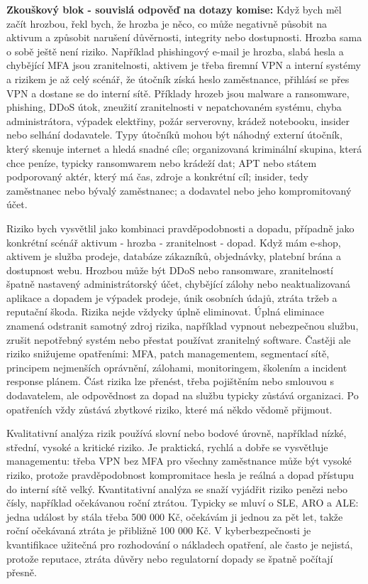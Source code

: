 \begin{beigebox}
\textbf{Zkouškový blok - souvislá odpověď na dotazy komise:}
Když bych měl začít hrozbou, řekl bych, že hrozba je něco, co může negativně působit na aktivum a způsobit narušení důvěrnosti, integrity nebo dostupnosti. Hrozba sama o sobě ještě není riziko. Například phishingový e-mail je hrozba, slabá hesla a chybějící MFA jsou zranitelnosti, aktivem je třeba firemní VPN a interní systémy a rizikem je až celý scénář, že útočník získá heslo zaměstnance, přihlásí se přes VPN a dostane se do interní sítě. Příklady hrozeb jsou malware a ransomware, phishing, DDoS útok, zneužití zranitelnosti v nepatchovaném systému, chyba administrátora, výpadek elektřiny, požár serverovny, krádež notebooku, insider nebo selhání dodavatele. Typy útočníků mohou být náhodný externí útočník, který skenuje internet a hledá snadné cíle; organizovaná kriminální skupina, která chce peníze, typicky ransomwarem nebo krádeží dat; APT nebo státem podporovaný aktér, který má čas, zdroje a konkrétní cíl; insider, tedy zaměstnanec nebo bývalý zaměstnanec; a dodavatel nebo jeho kompromitovaný účet.

Riziko bych vysvětlil jako kombinaci pravděpodobnosti a dopadu, případně jako konkrétní scénář aktivum - hrozba - zranitelnost - dopad. Když mám e-shop, aktivem je služba prodeje, databáze zákazníků, objednávky, platební brána a dostupnost webu. Hrozbou může být DDoS nebo ransomware, zranitelností špatně nastavený administrátorský účet, chybějící zálohy nebo neaktualizovaná aplikace a dopadem je výpadek prodeje, únik osobních údajů, ztráta tržeb a reputační škoda. Rizika nejde vždycky úplně eliminovat. Úplná eliminace znamená odstranit samotný zdroj rizika, například vypnout nebezpečnou službu, zrušit nepotřebný systém nebo přestat používat zranitelný software. Častěji ale riziko snižujeme opatřeními: MFA, patch managementem, segmentací sítě, principem nejmenších oprávnění, zálohami, monitoringem, školením a incident response plánem. Část rizika lze přenést, třeba pojištěním nebo smlouvou s dodavatelem, ale odpovědnost za dopad na službu typicky zůstává organizaci. Po opatřeních vždy zůstává zbytkové riziko, které má někdo vědomě přijmout.

Kvalitativní analýza rizik používá slovní nebo bodové úrovně, například nízké, střední, vysoké a kritické riziko. Je praktická, rychlá a dobře se vysvětluje managementu: třeba VPN bez MFA pro všechny zaměstnance může být vysoké riziko, protože pravděpodobnost kompromitace hesla je reálná a dopad přístupu do interní sítě velký. Kvantitativní analýza se snaží vyjádřit riziko penězi nebo čísly, například očekávanou roční ztrátou. Typicky se mluví o SLE, ARO a ALE: jedna událost by stála třeba 500 000 Kč, očekávám ji jednou za pět let, takže roční očekávaná ztráta je přibližně 100 000 Kč. V kyberbezpečnosti je kvantifikace užitečná pro rozhodování o nákladech opatření, ale často je nejistá, protože reputace, ztráta důvěry nebo regulatorní dopady se špatně počítají přesně.


\end{beigebox}
